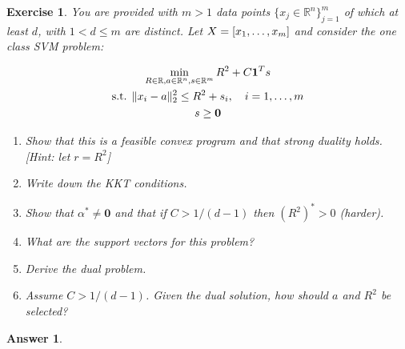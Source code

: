 \documentclass[12pt]{article}
\theoremstyle{colon}
\newtheorem{exercise}{Exercise}
\newtheorem*{answer}{Answer}
\begin{document}
\begin{exercise}
  You are provided with $m > 1$ data points $\{x_j \in \mathbb{R}^n\}_{j=1}^m$ of which at least $d$, with $1 < d \leq m$ are distinct. Let $X = [x_1,  \mathellipsis, x_m]$ and consider the one class SVM problem:

  \begin{gather*}
    \min_{R \in \mathbb{R}, a \in \mathbb{R}^n, s \in \mathbb{R}^m} R^2 + C \bm{1}^T s \\
    \text{s.t. } \lVert x_i - a \rVert_2^2 \leq R^2 + s_i, \quad i = 1, \mathellipsis, m \\
    s \geq \bm{0}
  \end{gather*}

  \begin{enumerate}[label=\alph*)]
    \item Show that this is a feasible convex program and that strong duality holds. [Hint: let $r = R^2$]

    \item Write down the KKT conditions.

    \item Show that $\alpha^* \neq \bm{0}$ and that if $C > 1/(d-1)$ then $(R^2)^* > 0$ (harder).

    \item What are the support vectors for this problem?

    \item Derive the dual problem.

    \item Assume $C > 1/(d-1)$. Given the dual solution, how should $a$ and $R^2$ be selected?
  \end{enumerate}
\end{exercise}

\begin{answer}

\end{answer}
\end{document}

